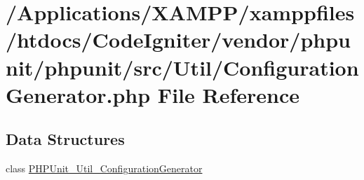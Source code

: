 \hypertarget{_configuration_generator_8php}{}\section{/\+Applications/\+X\+A\+M\+P\+P/xamppfiles/htdocs/\+Code\+Igniter/vendor/phpunit/phpunit/src/\+Util/\+Configuration\+Generator.php File Reference}
\label{_configuration_generator_8php}
\subsection*{Data Structures}
\begin{DoxyCompactItemize}
\item 
class \mbox{\hyperlink{class_p_h_p_unit___util___configuration_generator}{P\+H\+P\+Unit\+\_\+\+Util\+\_\+\+Configuration\+Generator}}
\end{DoxyCompactItemize}
